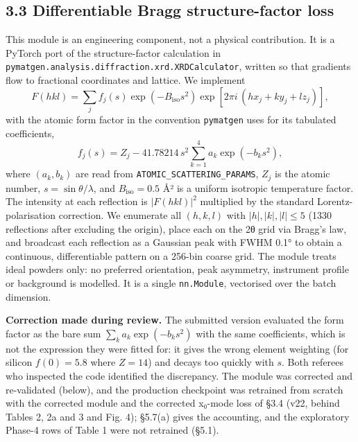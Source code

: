 \documentclass[
  11pt,
]{article}
\begin{document}
\subsection{3.3 Differentiable Bragg structure-factor
loss}\label{differentiable-bragg-structure-factor-loss}

This module is an engineering component, not a physical contribution. It
is a PyTorch port of the structure-factor calculation in
\texttt{pymatgen.analysis.diffraction.xrd.XRDCalculator}, written so
that gradients flow to fractional coordinates and lattice. We implement
\[
F(hkl) = \sum_j f_j(s) \exp\!\left(-B_{\text{iso}} s^2\right) \exp\!\left[2\pi i\,(h x_j + k y_j + l z_j)\right],
\] with the atomic form factor in the convention \texttt{pymatgen} uses
for its tabulated coefficients, \[
f_j(s) = Z_j - 41.78214\, s^2 \sum_{k=1}^{4} a_k \exp(-b_k s^2),
\] where \((a_k, b_k)\) are read from
\texttt{ATOMIC\_SCATTERING\_PARAMS}, \(Z_j\) is the atomic number,
\(s = \sin\theta/\lambda\), and \(B_{\text{iso}} = 0.5\) Å² is a uniform
isotropic temperature factor. The intensity at each reflection is
\(|F(hkl)|^2\) multiplied by the standard Lorentz-polarisation
correction. We enumerate all \((h,k,l)\) with \(|h|,|k|,|l| \le 5\)
(1330 reflections after excluding the origin), place each on the 2θ grid
via Bragg's law, and broadcast each reflection as a Gaussian peak with
FWHM 0.1° to obtain a continuous, differentiable pattern on a 256-bin
coarse grid. The module treats ideal powders only: no preferred
orientation, peak asymmetry, instrument profile or background is
modelled. It is a single \texttt{nn.Module}, vectorised over the batch
dimension.

\textbf{Correction made during review.} The submitted version evaluated
the form factor as the bare sum \(\sum_k a_k \exp(-b_k s^2)\) with the
same coefficients, which is not the expression they were fitted for: it
gives the wrong element weighting (for silicon \(f(0) = 5.8\) where
\(Z = 14\)) and decays too quickly with \(s\). Both referees who
inspected the code identified the discrepancy. The module was corrected
and re-validated (below), and the production checkpoint was retrained
from scratch with the corrected module and the corrected x₀-mode loss of
§3.4 (v22, behind Tables 2, 2a and 3 and Fig. 4); §5.7(a) gives the
accounting, and the exploratory Phase-4 rows of Table 1 were not
retrained (§5.1).
\end{document}
